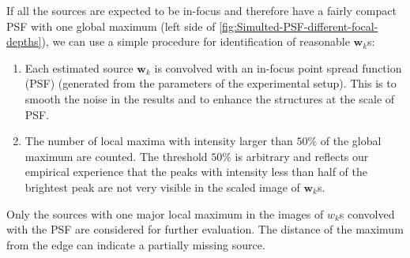 If all the sources are expected to be in-focus and therefore have a fairly compact PSF with one global maximum (left side of \autoref{fig:Simulted-PSF-different-focal-depths}), we can use a simple procedure for identification of reasonable $\bm{w}_k$s:
%
\begin{enumerate}
	\item
	Each estimated source $\bm{w}_k$ is convolved with an in-focus point spread function (PSF) (generated from the parameters of the experimental setup). This is to smooth the noise in the results and to enhance the structures at the scale of PSF. 
	\item
	The number of local maxima with intensity larger than $50\%$ of the global maximum are counted. The threshold $50\%$ is arbitrary and reflects our empirical experience that the peaks with intensity less than half of the brightest peak are not very visible in the scaled image of $\bm{w}_k$s.
\end{enumerate}

Only the sources with one major local maximum in the images of $w_k$s convolved with the PSF are considered for further evaluation. The distance of the maximum from the edge can indicate a partially missing source. 

